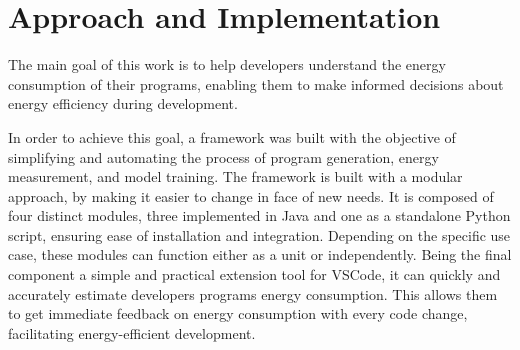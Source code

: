 \chapter{Approach and Implementation}\label{chapter:approach}


The main goal of this work is to help developers understand the energy consumption of their programs, enabling them to make informed decisions about energy efficiency during development.

In order to achieve this goal, a framework was built with the objective of simplifying and automating the process of program generation, energy measurement, and model training. The framework is built with a modular approach, by making it easier to change in face of new needs. It is composed of four distinct modules, three implemented in Java and one as a standalone Python script, ensuring ease of installation and integration. Depending on the specific use case, these modules can function either as a unit or independently. Being the final component a simple and practical extension tool for VSCode, it can quickly and accurately estimate developers programs energy consumption. This allows them to get immediate feedback on energy consumption with every code change, facilitating energy-efficient development.


